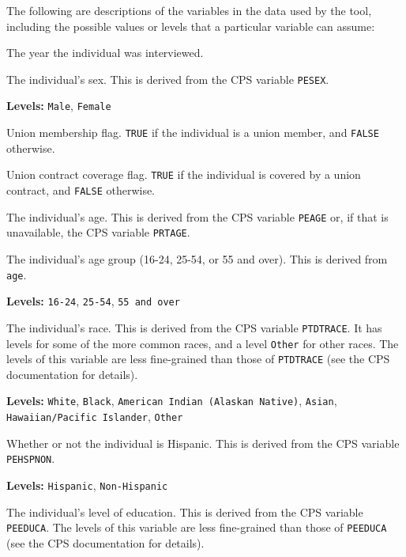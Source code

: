 \documentclass[letterpaper,12pt]{article}
\begin{document}
The following are descriptions of the variables in the data used by the tool,
including the possible values or levels that a particular variable can assume:
\begin{description}[style=multiline,leftmargin=3cm,font=\normalfont]
\item[\texttt{year}] The year the individual was interviewed.

\item[\texttt{sex}] The individual's sex. This is derived from the CPS variable
\texttt{PESEX}.

\textbf{Levels:} \texttt{Male}, \texttt{Female}

\item[\texttt{member}] Union membership flag. \texttt{TRUE} if the individual is
a union member, and \texttt{FALSE} otherwise.

\item[\texttt{covered}] Union contract coverage flag. \texttt{TRUE} if the
individual is covered by a union contract, and \texttt{FALSE} otherwise.

\item[\texttt{age}] The individual's age. This is derived from the CPS variable
\texttt{PEAGE} or, if that is unavailable, the CPS variable \texttt{PRTAGE}.

\item[\texttt{age\_group}] The individual's age group (16-24, 25-54, or 55 and
over). This is derived from \texttt{age}.

\textbf{Levels:} \texttt{16-24}, \texttt{25-54}, \texttt{55 and over}

\item[\texttt{race}] The individual's race. This is derived from the CPS
variable \texttt{PTDTRACE}. It has levels for some of the more common races, and
a level \texttt{Other} for other races. The levels of this variable are less
fine-grained than those of \texttt{PTDTRACE} (see the CPS documentation for
details).

\textbf{Levels:} \texttt{White}, \texttt{Black}, \texttt{American Indian
(Alaskan Native)}, \texttt{Asian}, \texttt{Hawaiian/Pacific Islander},
\texttt{Other}

\item[\texttt{hisp}] Whether or not the individual is Hispanic. This is derived
from the CPS variable \texttt{PEHSPNON}.

\textbf{Levels:} \texttt{Hispanic}, \texttt{Non-Hispanic}

\item[\texttt{educ}] The individual's level of education. This is derived from
the CPS variable \texttt{PEEDUCA}. The levels of this variable are less
fine-grained than those of \texttt{PEEDUCA} (see the CPS documentation for
details).


\end{description}
\end{document}
